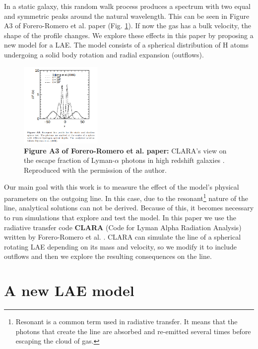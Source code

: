 \documentclass[twocolappendix]{latex/emulateapj}
\begin{document}
In a static galaxy, this random walk process produces a spectrum with two equal and symmetric peaks around the natural \lya wavelength. This can be seen in Figure A3 of Forero-Romero et al. paper \cite{CLARA} (Fig. \ref{fig:static}). If now the gas has a bulk velocity, the shape of the \lya profile changes. We explore these effects in this paper by proposing a new model for a LAE. The model consists of a spherical distribution of H atoms undergoing a solid body rotation and radial expansion (outflows). \\

\begin{figure}[h!]
	\begin{center}
		\includegraphics[width=0.35\textwidth]{./figures/static}
	\end{center}
	\caption{\textbf{Figure A3 of Forero-Romero et al. paper:} CLARA's view on the escape fraction of Lyman-$\alpha$ photons in high redshift galaxies \cite{CLARA}. Reproduced with the permission of the author.
		\label{fig:static}}
\end{figure}

Our main goal with this work is to measure the effect of the model's physical parameters on the outgoing \lya line. In this case, due to the resonant\footnote{Resonant is a common term used in radiative transfer. It means that the photons that create the line are absorbed and re-emitted several times before escaping the cloud of gas.} nature of the \lya line, analytical solutions can not be derived. Because of this, it becomes necessary to run simulations that explore and test the model. In this paper we use the radiative transfer code \textbf{CLARA} (Code for Lyman Alpha Radiation Analysis) written by Forero-Romero et al. \cite{CLARA}. CLARA can simulate the \lya line of a spherical rotating LAE depending on its mass and velocity, so we modify it to include outflows and then we explore the resulting consequences on the \lya line. \\


\section{A new LAE model}
\label{sec:newmodel}
\end{document}

